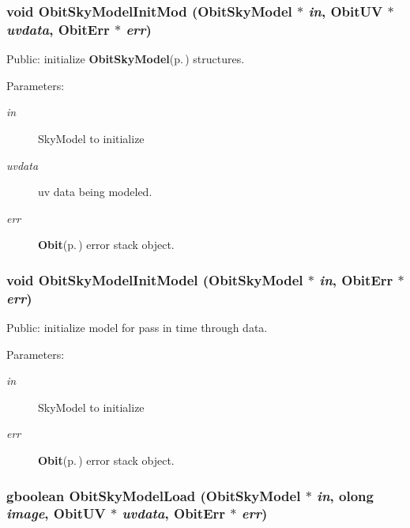 \subsubsection{\setlength{\rightskip}{0pt plus 5cm}void Obit\-Sky\-Model\-Init\-Mod ({\bf Obit\-Sky\-Model} $\ast$ {\em in}, {\bf Obit\-UV} $\ast$ {\em uvdata}, {\bf Obit\-Err} $\ast$ {\em err})}\label{ObitSkyModel_8c_a19}


Public: initialize {\bf Obit\-Sky\-Model}{\rm (p.\,\pageref{structObitSkyModel})} structures. 

\begin{Desc}
\item[Parameters:]
\begin{description}
\item[{\em in}]Sky\-Model to initialize \item[{\em uvdata}]uv data being modeled. \item[{\em err}]{\bf Obit}{\rm (p.\,\pageref{structObit})} error stack object. \end{description}
\end{Desc}
\subsubsection{\setlength{\rightskip}{0pt plus 5cm}void Obit\-Sky\-Model\-Init\-Model ({\bf Obit\-Sky\-Model} $\ast$ {\em in}, {\bf Obit\-Err} $\ast$ {\em err})}\label{ObitSkyModel_8c_a21}


Public: initialize model for pass in time through data. 

\begin{Desc}
\item[Parameters:]
\begin{description}
\item[{\em in}]Sky\-Model to initialize \item[{\em err}]{\bf Obit}{\rm (p.\,\pageref{structObit})} error stack object. \end{description}
\end{Desc}
\subsubsection{\setlength{\rightskip}{0pt plus 5cm}gboolean Obit\-Sky\-Model\-Load ({\bf Obit\-Sky\-Model} $\ast$ {\em in}, {\bf olong} {\em image}, {\bf Obit\-UV} $\ast$ {\em uvdata}, {\bf Obit\-Err} $\ast$ {\em err})}\label{ObitSkyModel_8c_a24}



